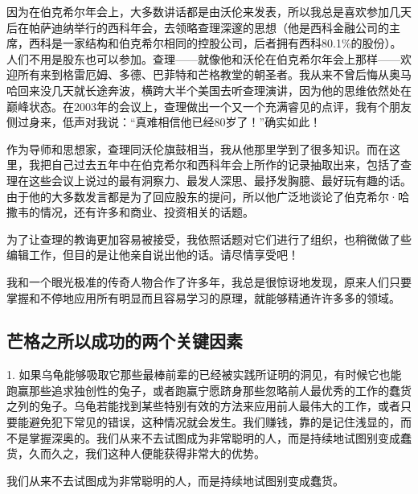 因为在伯克希尔年会上，大多数讲话都是由沃伦来发表，所以我总是喜欢参加几天后在帕萨迪纳举行的西科年会，去领略查理深邃的思想（他是西科金融公司的主席，西科是一家结构和伯克希尔相同的控股公司，后者拥有西科80.1\%的股份）。人们不用是股东也可以参加。查理——就像他和沃伦在伯克希尔年会上那样——欢迎所有来到格雷厄姆、多德、巴菲特和芒格教堂的朝圣者。我从来不曾后悔从奥马哈回来没几天就长途奔波，横跨大半个美国去听查理演讲，因为他的思维依然处在巅峰状态。在2003年的会议上，查理做出一个又一个充满睿见的点评，我有个朋友侧过身来，低声对我说：“真难相信他已经80岁了！”确实如此！
\par

作为导师和思想家，查理同沃伦旗鼓相当，我从他那里学到了很多知识。而在这里，我把自己过去五年中在伯克希尔和西科年会上所作的记录抽取出来，包括了查理在这些会议上说过的最有洞察力、最发人深思、最抒发胸臆、最好玩有趣的话。由于他的大多数发言都是为了回应股东的提问，所以他广泛地谈论了伯克希尔·哈撒韦的情况，还有许多和商业、投资相关的话题。
\par

为了让查理的教诲更加容易被接受，我依照话题对它们进行了组织，也稍微做了些编辑工作，但目的是让他亲自说出他的话。请尽情享受吧！
\par

\begin{WisdomBox}
\par

我和一个眼光极准的传奇人物合作了许多年，我总是很惊讶地发现，原来人们只要掌握和不停地应用所有明显而且容易学习的原理，就能够精通许许多多的领域。
\par
\end{WisdomBox}

\subsection*{芒格之所以成功的两个关键因素}

1. 如果乌龟能够吸取它那些最棒前辈的已经被实践所证明的洞见，有时候它也能跑赢那些追求独创性的兔子，或者跑赢宁愿跻身那些忽略前人最优秀的工作的蠢货之列的兔子。乌龟若能找到某些特别有效的方法来应用前人最伟大的工作，或者只要能避免犯下常见的错误，这种情况就会发生。我们赚钱，靠的是记住浅显的，而不是掌握深奥的。我们从来不去试图成为非常聪明的人，而是持续地试图别变成蠢货，久而久之，我们这种人便能获得非常大的优势。
\par

\begin{WisdomBox}
\par

我们从来不去试图成为非常聪明的人，而是持续地试图别变成蠢货。
\par
\end{WisdomBox}

